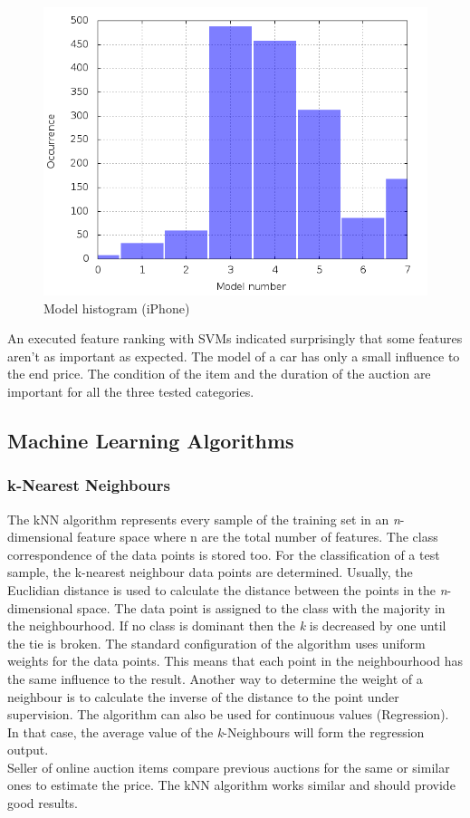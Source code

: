 \begin{figure}
\centering
\includegraphics[scale=0.5]{images/plots/iphone/hist_model_iphone.png}
\caption{Model histogram (iPhone)}
\label{model_hist_iphone}
\end{figure}
An executed feature ranking \cite{guyon} with SVMs indicated surprisingly that some features aren't as important as expected. The model of a car has only a small influence to the end price. The condition of the item and the duration of the auction are important for all the three tested categories. 
\subsection{Machine Learning Algorithms}
\subsubsection{k-Nearest Neighbours}
The kNN algorithm \cite{knn} represents every sample of the training set in an \textit{n}-dimensional feature space where n are the total number of features. The class correspondence of the data points is stored too. For the classification of a test sample, the k-nearest neighbour data points are determined. Usually, the Euclidian distance is used to calculate the distance between the points in the \textit{n}-dimensional space. The data point is assigned to the class with the majority in the neighbourhood. If no class is dominant then the \textit{k} is decreased by one until the tie is broken. The standard configuration of the algorithm uses uniform weights for the data points. This means that each point in the neighbourhood has the same influence to the result. Another way to determine the weight of a neighbour is to calculate the inverse of the distance to the point under supervision. The algorithm can also be used for continuous values (Regression). In that case, the average value of the \textit{k}-Neighbours will form the regression output.\\
Seller of online auction items compare previous auctions for the same or similar ones to estimate the price. The kNN algorithm works similar and should provide good results. 
